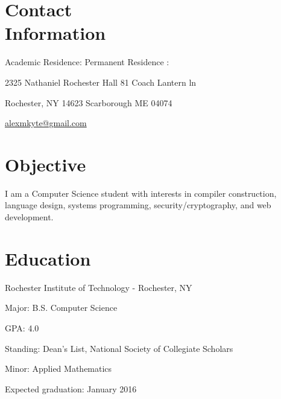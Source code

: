 \documentclass[letter,margin,line]{resume}
\begin{document}
\begin{resume}
\section{\mysidestyle Contact \\ Information} \vspace{2mm}
	\begin{asparablank}
		\item Academic Residence: \hfill Permanent Residence : \hfill
		\item 2325 Nathaniel Rochester Hall \hfill 81 Coach Lantern ln \hfill
		\item Rochester, NY 14623 \hfill Scarborough ME 04074 \hfill
		\\		
		\item\href{mailto:alexmkyte@gmail.com}{alexmkyte@gmail.com} \hfill
	\end{asparablank}

\section{\mysidestyle Objective} \vspace{2mm}
	\begin{asparablank} 
	\item I am a Computer Science student with interests in compiler construction, language design, systems programming, security/cryptography, and web development. 
	 \end{asparablank}

\section{\mysidestyle Education}
	\begin{compactdesc}
		\item[Rochester Institute of Technology] - Rochester, NY 
		\begin{compactitem} { \small
			\item Major: B.S. Computer Science
			\item GPA: 4.0
			\item Standing: Dean's List, National Society of Collegiate Scholars
			\item Minor: Applied Mathematics
			\item Expected graduation: January 2016
		} \end{compactitem}
	\end{compactdesc}


\end{resume}
\end{document}
